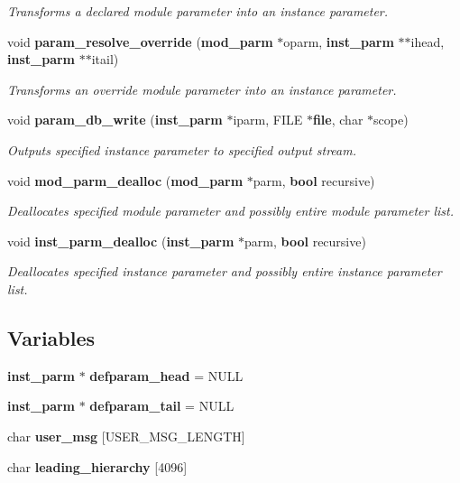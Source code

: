 \begin{CompactItemize}
\begin{CompactList}\small\item\em Transforms a declared module parameter into an instance parameter.\item\end{CompactList}\item 
void {\bf param\_\-resolve\_\-override} ({\bf mod\_\-parm} $\ast$oparm, {\bf inst\_\-parm} $\ast$$\ast$ihead, {\bf inst\_\-parm} $\ast$$\ast$itail)
\begin{CompactList}\small\item\em Transforms an override module parameter into an instance parameter.\item\end{CompactList}\item 
void {\bf param\_\-db\_\-write} ({\bf inst\_\-parm} $\ast$iparm, FILE $\ast${\bf file}, char $\ast$scope)
\begin{CompactList}\small\item\em Outputs specified instance parameter to specified output stream.\item\end{CompactList}\item 
void {\bf mod\_\-parm\_\-dealloc} ({\bf mod\_\-parm} $\ast$parm, {\bf bool} recursive)
\begin{CompactList}\small\item\em Deallocates specified module parameter and possibly entire module parameter list.\item\end{CompactList}\item 
void {\bf inst\_\-parm\_\-dealloc} ({\bf inst\_\-parm} $\ast$parm, {\bf bool} recursive)
\begin{CompactList}\small\item\em Deallocates specified instance parameter and possibly entire instance parameter list.\item\end{CompactList}\end{CompactItemize}
\subsection*{Variables}
\begin{CompactItemize}
\item 
{\bf inst\_\-parm} $\ast$ {\bf defparam\_\-head} = NULL
\item 
{\bf inst\_\-parm} $\ast$ {\bf defparam\_\-tail} = NULL
\item 
char {\bf user\_\-msg} [USER\_\-MSG\_\-LENGTH]
\item 
char {\bf leading\_\-hierarchy} [4096]
\end{CompactItemize}


